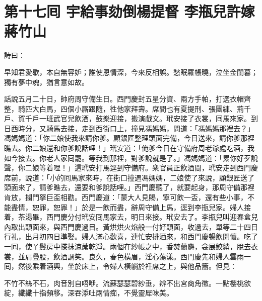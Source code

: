 
\chapter*{第十七囘 宇給事劾倒楊提督 李瓶兒許嫁蔣竹山}


詩曰：

早知君愛歇，本自無容妒；誰使恩情深，今來反相誤。愁眠羅帳曉，泣坐金閨暮；獨有夢中魂，猶言意如故。

話說五月二十日，帥府周守備生日。西門慶封五星分資、兩方手帕，打選衣帽齊整，騎匹大白馬，四個小厮跟隨，徃他家拜壽。席間也有夏提刑、張團練、荊千戶、賀千戶一班武官兒飲酒，鼓樂迎接，搬演戲文。玳安接了衣裳，囘馬來家。到日西時分，又騎馬去接，走到西街口上，撞見馮媽媽，問道：「馮媽媽那裡去？」馮媽媽道：「你二娘使我來請你爹。顧銀匠整理頭面完備，今日送來，請你爹那裡瞧去。你二娘還和你爹說話哩！」玳安道：「俺爹今日在守備府周老爺處吃酒，我如今接去。你老人家囘罷。等我到那裡，對爹說就是了。」馮媽媽道：「累你好歹說聲，你二娘等着哩！」這玳安打馬逕到守備府。衆官員正飲酒間，玳安走到西門慶席前，說道：「小的囘馬家來時，在街口撞遇馮媽媽，二娘使了來說，顧銀匠送了頭面來了，請爹瞧去，還要和爹說話哩。」西門慶聽了，就要起身，那周守備那裡肯放，攔門拏巨盃相勸。西門慶道：「蒙大人見賜，寧可飲一盃，還有些小事，不能盡情，恕罪，恕罪！」於是一飲而盡，辭周守備上馬，逕到李瓶兒家。婦人接着，茶湯畢，西門慶分付玳安囘馬家去，明日來接。玳安去了。李瓶兒叫迎春盒兒內取出頭面來，與西門慶過目。黃烘烘火焰般一付好頭面，收過去，單等二十四日行礼，出月初四日準娶。婦人滿心歡喜，連忙安排酒來，和西門慶暢飲開懷。吃了一囘，使丫鬟房中搽抹涼蓆乾淨。兩個在紗帳之中，香焚蘭麝，衾展鮫綃，脫去衣裳，並肩疊股，飲酒調笑。良久，春色橫眉，淫心蕩漾。西門慶先和婦人雲雨一囘，然後乘着酒興，坐於床上，令婦人橫躺於衽席之上，與他品簫。但見：

不竹不絲不石，肉音別自唔咿。流蘇瑟瑟碧紗垂，辨不出宮商角徵。一點櫻桃欲綻，纖纖十指頻移。深吞添吐兩情痴，不覺靈犀味美。

